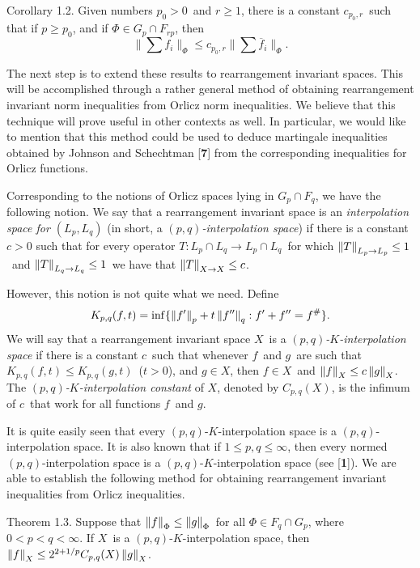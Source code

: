 \proclaim Corollary 1.2. Given numbers $p_0>0$\ and $r\ge 1$,
there is a constant $c_{p_0,r}$\ such that if $p \ge p_0$, and if $\Phi \in
G_p \cap F_{rp}$, then $$ \|\sum f_i\|_\Phi \leq c_{p_0,r} \|\sum\overline
f_i\|_\Phi.$$

The next step is to extend these results to rearrangement invariant 
spaces.  This will be accomplished through a rather general
method of obtaining rearrangement invariant norm inequalities from Orlicz
norm inequalities. We believe that this technique will prove useful
in other contexts as well. In particular, we would like to mention
that this method could be used to deduce martingale inequalities
obtained by Johnson and Schechtman [{\bf 7}] from the corresponding
inequalities for Orlicz functions.

   Corresponding to the notions of
Orlicz spaces lying in $G_p \cap F_q$, we have the following notion. We
say that a rearrangement invariant space is an {\it interpolation space
for $(L_p,L_q)$\/} (in short, a {\it $(p,q)$-interpolation space\/}) if
there is a constant $c > 0$ such that for every operator $T:L_p \cap L_q
\to L_p \cap L_q$\ for which $\left\|T\right\|_{L_p \to L_p} \le 1$\ and $\left\|T\right\|_{L_q \to L_q} \le 1$\ we have that $\left\|T\right\|_{X \to X} \le c$.

However, this notion is not quite what we need. Define $$ K_{p,q}(f,t) =
\inf\{ \left\|f'\right\|_p + t \left\|f''\right\|_q : f' + f'' = f^\# \} .$$
We will say that a rearrangement invariant space $X$\ is a  {\it
$(p,q)$-$K$-interpolation space\/} if there is a constant 
$c$\ such that
whenever $f$\ and $g$\ are such that 
$K_{p,q}(f,t) \le K_{p,q}(g,t)$\ ($t > 0$),   and $g \in
X$, then $f \in X$\ and $\left\|f\right\|_X \le c \left\|g\right\|_X$. The {\it
$(p,q)$-$K$-interpolation constant\/} of $X$, denoted by $C_{p,q}(X)$,
is the infimum of $c$\ that work for all  functions $f$\ and $g$.

It is quite easily seen that every $(p,q)$-$K$-interpolation space is a
$(p,q)$-interpolation space.
It is also known that if $1 \le p,q \le \infty$, then every normed
$(p,q)$-interpolation space is a 
$(p,q)$-$K$-interpolation space (see [{\bf 1}]).
We are able to establish the following method for obtaining 
rearrangement invariant inequalities from Orlicz inequalities.

\proclaim Theorem 1.3. Suppose that $\left\|f\right\|_\Phi \le  \left\|g\right\|_\Phi$\
for all $\Phi \in F_q \cap G_p$, where $0 < p < q < \infty$. If
$X$\ is a $(p,q)$-$K$-interpolation space, then $\left\|f\right\|_X \le
2^{2+1/p} C_{p,q}(X) \left\|g\right\|_X$.

